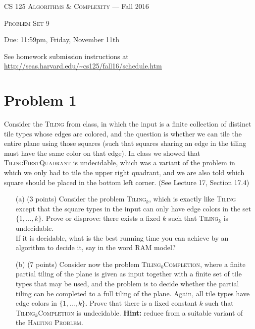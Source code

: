 \documentclass[12pt]{article}
\begin{document}
\thispagestyle{empty}

\begin{center}
{\Large \textsc{CS 125 Algorithms \& Complexity} --- Fall 2016}

\bigskip

{\Large \textsc{Problem Set 9}}

\smallskip

Due: 11:59pm, Friday, November 11th

\bigskip

{\footnotesize See homework submission instructions at \url{http://seas.harvard.edu/~cs125/fall16/schedule.htm}}
\end{center}


\section*{Problem 1} 


Consider the \textsc{Tiling} from class, in which the input is a finite collection of distinct tile types whose edges are colored, and the question is whether we can tile the entire plane using those squares (such that squares sharing an edge in the tiling must have the same color on that edge). In class we showed that \textsc{TilingFirstQuadrant} is undecidable, which was a variant of the problem in which we only had to tile the upper right quadrant, and we are also told which square should be placed in the bottom left corner. (See Lecture 17, Section 17.4)
\begin{itemize}
\item[(a)] (3 points) Consider the problem \textsc{Tiling}$_k$, which is exactly like \textsc{Tiling} except that the square types in the input can only have edge colors in the set $\{1,\ldots,k\}$. Prove or disprove: there exists a fixed $k$ such that \textsc{Tiling}$_k$ is undecidable.\\If it is decidable, what is the best running time you can achieve by an algorithm to decide it, say in the word RAM model?
\item[(b)] (7 points) Consider now the problem \textsc{Tiling}$_k$\textsc{Completion}, where a finite partial tiling of the plane is given as input together with a finite set of tile types that may be used, and the problem is to decide whether the partial tiling can be completed to a full tiling of the plane. Again, all tile types have edge colors in $\{1,\ldots,k\}$. Prove that there is a fixed constant $k$ such that \textsc{Tiling}$_k$\textsc{Completion} is undecidable. \textbf{Hint:} reduce from a suitable variant of the \textsc{Halting Problem}.
\end{itemize}
\end{document}
